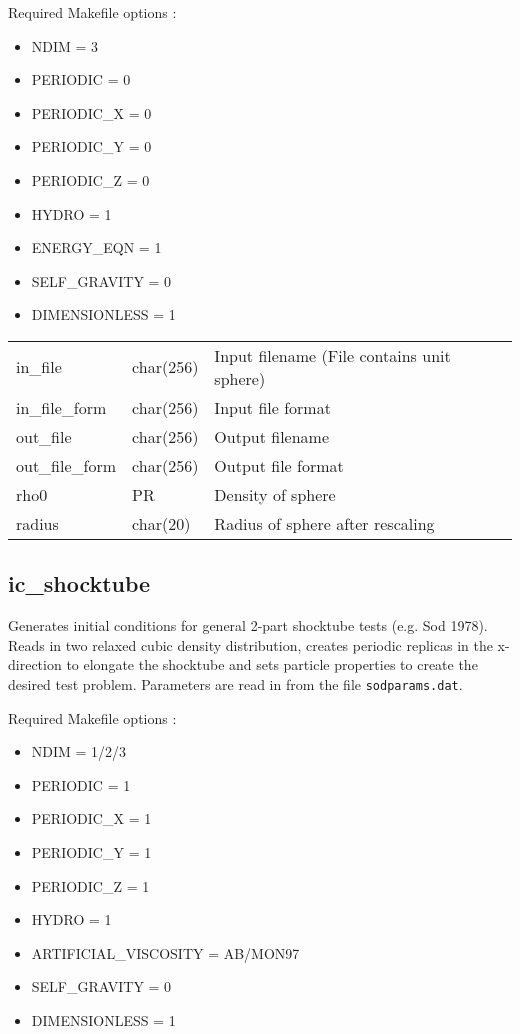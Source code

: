 \documentclass[a4paper]{article}
\newcommand{\var}[1]{\texttt{#1}}
\begin{document}
\noindent Required Makefile options :
\begin{itemize}
\item NDIM = 3
\item PERIODIC = 0
\item PERIODIC\_X = 0
\item PERIODIC\_Y = 0
\item PERIODIC\_Z = 0
\item HYDRO = 1
\item ENERGY\_EQN = 1
\item SELF\_GRAVITY = 0
\item DIMENSIONLESS = 1
\end{itemize}

\vspace{0.1cm}

\begin{center}
\begin{supertabular}{|p{3cm}|p{2cm}|p{8cm}|}
in\_file         & char(256) & Input filename (File contains unit sphere)\\
in\_file\_form   & char(256) & Input file format \\
out\_file        & char(256) & Output filename \\
out\_file\_form  & char(256) & Output file format \\
rho0             & PR        & Density of sphere \\
radius           & char(20)  & Radius of sphere after rescaling \\
\end{supertabular}
\end{center}

\newpage


\subsection{ic\_shocktube}
Generates initial conditions for general 2-part shocktube tests (e.g. Sod 1978). Reads in two relaxed cubic density distribution, creates periodic replicas in the x-direction to elongate the shocktube and sets particle properties to create the desired test problem.  Parameters are read in from the file \var{sodparams.dat}. \newline

\noindent Required Makefile options :
\begin{itemize}
\item NDIM = 1/2/3
\item PERIODIC = 1
\item PERIODIC\_X = 1
\item PERIODIC\_Y = 1
\item PERIODIC\_Z = 1
\item HYDRO = 1
\item ARTIFICIAL\_VISCOSITY = AB/MON97
\item SELF\_GRAVITY = 0
\item DIMENSIONLESS = 1
\end{itemize}
\end{document}
